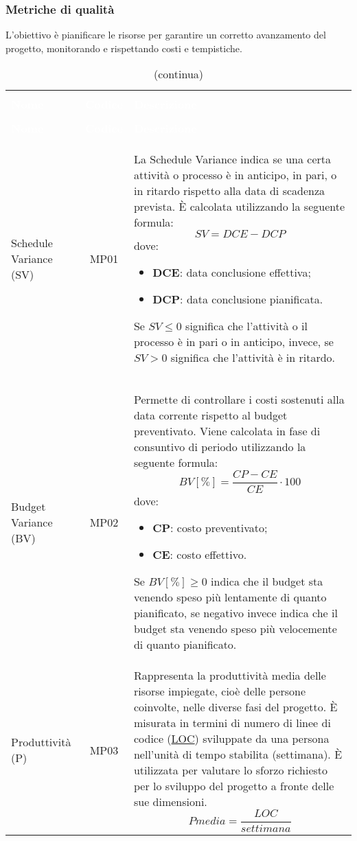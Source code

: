 \subsubsection{Metriche di qualità}
L’obiettivo è pianificare le risorse per garantire un corretto avanzamento del
progetto, monitorando e rispettando costi e tempistiche.
\begin{longtable}{ C{4.5cm} c L{9.5cm} }
	\caption{Metriche di qualità per la pianificazione efficiente delle risorse}\\
		\textcolor{white}{\textbf{Nome}} & \textcolor{white}{\textbf{Codice}} & \centerline{\textcolor{white}{\textbf{Descrizione}}} \\
		\endfirsthead
		\caption[]{(continua)} \\
		\textcolor{white}{\textbf{Nome}} & \textcolor{white}{\textbf{Codice}} & \centerline{\textcolor{white}{\textbf{Descrizione}}} \\
		\endhead
		Schedule Variance (SV)  & MP01 & La Schedule Variance indica se una certa attività o processo è in anticipo, in pari, o in ritardo rispetto alla data di scadenza prevista. È calcolata utilizzando la seguente formula: \newline
\[ SV = DCE-DCP\]
dove: \begin{itemize}
\item \textbf{DCE}: data conclusione effettiva;
\item \textbf{DCP}: data conclusione pianificata.
\end{itemize}
Se $SV \leq 0$ significa che l'attività o il processo è in pari o in anticipo, invece, se $SV > 0$ significa che l'attività è in ritardo. \\	
		Budget Variance (BV) & MP02 & Permette di controllare i costi sostenuti alla data corrente rispetto al budget preventivato. Viene calcolata in fase di consuntivo di periodo utilizzando la seguente formula: \newline
		\[ BV[\%] = \frac{CP-CE}{CE}\cdot 100 \]		
dove: \begin{itemize}
\item \textbf{CP}: costo preventivato;
\item \textbf{CE}: costo effettivo.
\end{itemize}
Se $BV[\%] \geq 0$ indica che il budget sta venendo speso più lentamente di quanto pianificato, se negativo invece indica che il budget sta venendo speso più velocemente di quanto pianificato. \\
Produttività (P) & MP03 & Rappresenta la produttività media delle risorse impiegate, cioè delle persone coinvolte, nelle diverse fasi del progetto. È misurata in termini di numero di linee di codice (\hyperref[par:MS01]{LOC}) sviluppate da una persona nell’unità di tempo stabilita (settimana). È utilizzata per valutare lo sforzo richiesto per lo sviluppo  del progetto a fronte delle sue dimensioni. 
\[ Pmedia = \frac{LOC}{settimana}\]
	\end{longtable}

